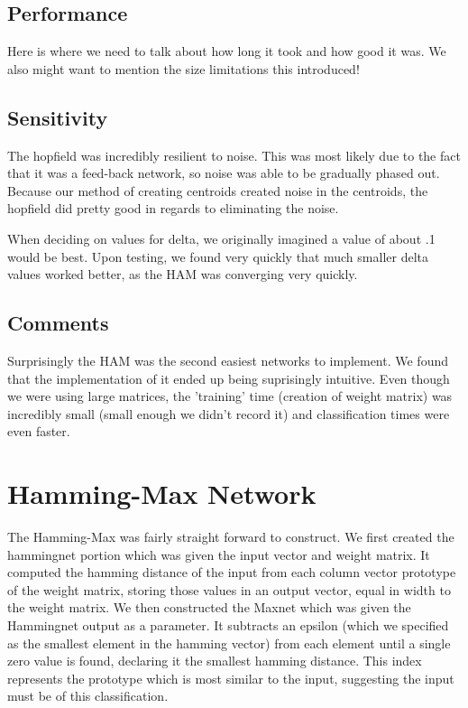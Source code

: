 \documentclass{article}
\begin{document}
\subsection{Performance}
Here is where we need to talk about how long it took and how good it was. We
also might want to mention the size limitations this introduced!

\subsection{Sensitivity}
The hopfield was incredibly resilient to noise. This was most likely due to the fact that it was a feed-back network, so noise was able to be gradually phased out. Because our method of creating centroids created noise in the centroids, the hopfield did pretty good in regards to eliminating the noise.

When deciding on values for delta, we originally imagined a value of about .1 would be best. Upon testing, we found very quickly that much smaller delta values worked better, as the HAM was converging very quickly.

\subsection{Comments}
Surprisingly the HAM was the second easiest networks to implement. We found that the implementation of it ended up being suprisingly intuitive. Even though we were using large matrices, the 'training' time (creation of weight matrix) was incredibly small (small enough we didn't record it) and classification times were even faster.





\section{Hamming-Max Network}
The Hamming-Max was fairly straight forward to construct.  We first created the hammingnet portion which was given the input vector and weight matrix.  It computed the hamming distance of the input from each column vector prototype of the weight matrix, storing those values in an output vector, equal in width to the weight matrix.  We then constructed the Maxnet which was given the Hammingnet output as a parameter.  It subtracts an epsilon (which we specified as the smallest element in the hamming vector) from each element until a single zero value is found, declaring it the smallest hamming distance.  This index represents the prototype which is most similar to the input, suggesting the input must be of this classification.
\end{document}
